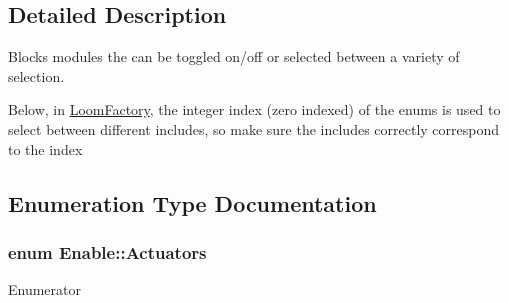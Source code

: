 \subsection{Detailed Description}
Blocks modules the can be toggled on/off or selected between a variety of selection. 

Below, in \hyperlink{class_loom_factory}{Loom\+Factory}, the integer index (zero indexed) of the enums is used to select between different includes, so make sure the includes correctly correspond to the index 

\subsection{Enumeration Type Documentation}
\subsubsection[{\texorpdfstring{Actuators}{Actuators}}]{\setlength{\rightskip}{0pt plus 5cm}enum {\bf Enable\+::\+Actuators}\hspace{0.3cm}{\ttfamily [strong]}}\hypertarget{namespace_enable_aad5ff0e67e478728f21443865359584b}{}\label{namespace_enable_aad5ff0e67e478728f21443865359584b}
\begin{Desc}
\item[Enumerator]\par
\begin{description}
\item[{\em 
Enabled\hypertarget{namespace_enable_aad5ff0e67e478728f21443865359584ba00d23a76e43b46dae9ec7aa9dcbebb32}{}\label{namespace_enable_aad5ff0e67e478728f21443865359584ba00d23a76e43b46dae9ec7aa9dcbebb32}
}]\item[{\em 
Disabled\hypertarget{namespace_enable_aad5ff0e67e478728f21443865359584bab9f5c797ebbf55adccdd8539a65a0241}{}\label{namespace_enable_aad5ff0e67e478728f21443865359584bab9f5c797ebbf55adccdd8539a65a0241}
}]\end{description}
\end{Desc}

